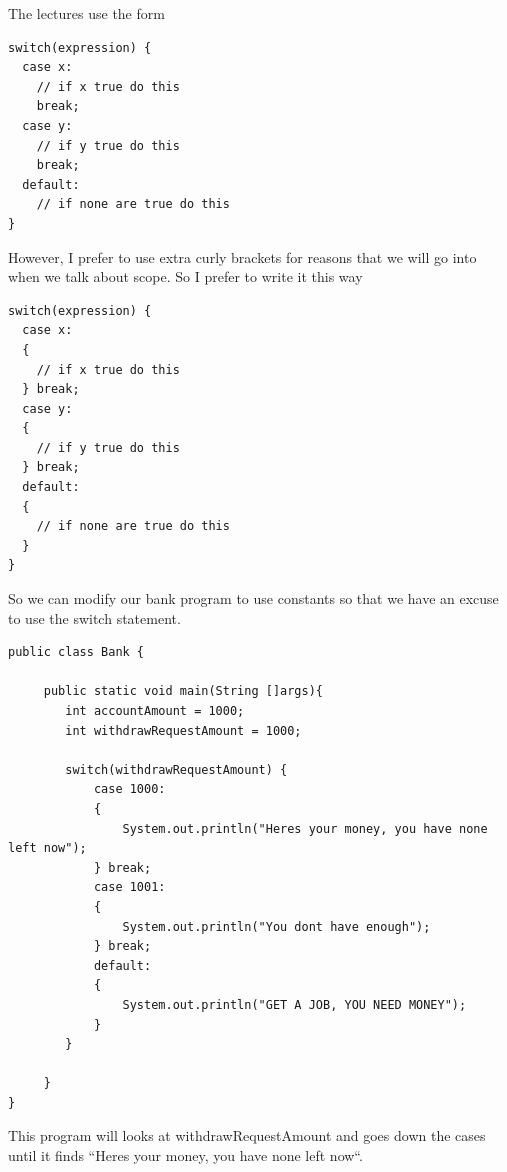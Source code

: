 \documentclass[11]{article}
\begin{document}
The lectures use the form
\begin{lstlisting}
switch(expression) {
  case x:
    // if x true do this
    break;
  case y:
    // if y true do this
    break;
  default:
    // if none are true do this
}
\end{lstlisting}

However, I prefer to use extra curly brackets for reasons that we will go into when we talk about scope. So I prefer to write it this way

\begin{lstlisting}
switch(expression) {
  case x:
  {
    // if x true do this
  } break;
  case y:
  {
    // if y true do this
  } break;
  default:
  {
    // if none are true do this
  }
}
\end{lstlisting}

So we can modify our bank program to use constants so that we have an excuse to use the switch statement.

\begin{lstlisting}
public class Bank {

     public static void main(String []args){
        int accountAmount = 1000;
        int withdrawRequestAmount = 1000;
        
        switch(withdrawRequestAmount) {
            case 1000:
            {
                System.out.println("Heres your money, you have none left now");
            } break;
            case 1001:
            {
                System.out.println("You dont have enough");
            } break;
            default:
            {
                System.out.println("GET A JOB, YOU NEED MONEY");
            }
        }
        
     }
}
\end{lstlisting}

This program will looks at withdrawRequestAmount and goes down the cases until it finds ``Heres your money, you have none left now``. 
\end{document}
